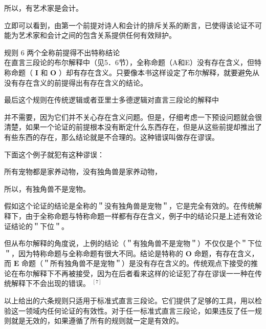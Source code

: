 所以，有艺术家是会计。

立即可以看到，由第一个前提对诗人和会计的排斥关系的断言，已使得该论证不可能为艺术家和会计之间的包含关系提供任何有效辩护。

规则 6 两个全称前提得不出特称结论\\
在直言三段论的布尔解释中（见5．6节），全称命题（A和E）没有存在含义，但特称命题（ $\mathbf{I}$ 和 $\mathbf{O}$ ）却有存在含义。只要像本书这样设定了布尔解释，就要避免从没有存在含义的前提得出有存在含义的结论。

最后这个规则在传统逻辑或者亚里士多德逻辑对直言三段论的解释中

并不需要，因为它们并不关心存在含义问题。但是，仔细考虑一下预设问题就会很清楚，如果一个论证的前提根本没有断定什么东西存在，但是从这些前提却推出了有些东西的存在，那么结论就是不合理的。这种错误叫做存在谬误。

下面这个例子就犯有这种谬误：

所有宠物都是家养动物，没有独角兽是家养动物，

所以，有独角兽不是宠物。

假如这个论证的结论是全称的＂没有独角兽是宠物＂，它是完全有效的。在传统解释下，由于全称命题与特称命题一样都有存在含义，例子中的结论只是上述有效论证结论的＂下位＂。

但从布尔解释的角度说，上例的结论（＂有独角兽不是宠物＂）不仅仅是个＂下位＂，因为特称命题与全称命题有很大不同。结论是特称的 $\mathbf{O}$ 命题，有存在含义，而 $\mathbf{E}$ 命题（＂所有独角兽不是宠物＂）是没有存在含义的。传统观点下接受的推论在布尔解释下不再被接受，因为在后者看来这样的论证犯了存在谬误一一种在传统解释下不会出现的错误。 ${ }^{[7]}$

以上给出的六条规则只适用于标准式直言三段论。它们提供了足够的工具，用以检验这一领域内任何论证的有效性。对于任一标准式直言三段论，如果违反了任一规则就是无效的，如果遵循了所有的规则就一定是有效的。 